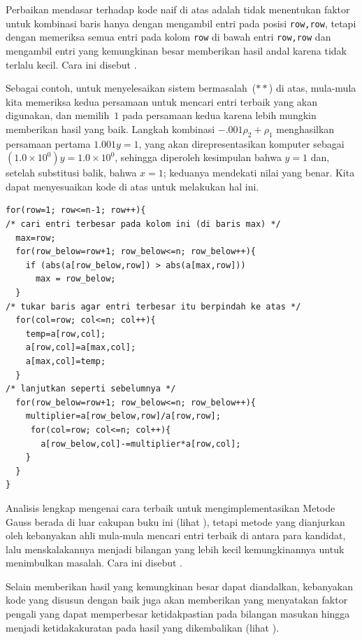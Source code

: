Perbaikan mendasar terhadap kode naif di atas adalah tidak menentukan faktor
untuk kombinasi baris hanya dengan mengambil entri pada posisi
\lstinline[style=inline]!row,row!, tetapi dengan memeriksa semua entri pada
kolom \lstinline[style=inline]!row! di bawah entri
\lstinline[style=inline]!row,row! dan mengambil entri yang kemungkinan besar
memberikan hasil andal karena tidak terlalu kecil.
Cara ini disebut .%

Sebagai contoh, untuk menyelesaikan sistem bermasalah~($**$) di atas, mula-mula
kita memeriksa kedua persamaan untuk mencari entri terbaik yang akan digunakan,
dan memilih~$1$ pada persamaan kedua karena lebih mungkin memberikan hasil yang
baik.
Langkah kombinasi $-.001\rho_2+\rho_1$ menghasilkan persamaan pertama
$1.001y=1$, yang akan direpresentasikan komputer sebagai
$(1.0\times 10^{0})y=1.0\times 10^{0}$, sehingga diperoleh kesimpulan bahwa
$y=1$ dan, setelah substitusi balik, bahwa $x=1$; keduanya mendekati nilai yang
benar.  
Kita dapat menyesuaikan kode di atas untuk melakukan hal ini.
\begin{lstlisting}
for(row=1; row<=n-1; row++){
/* cari entri terbesar pada kolom ini (di baris max) */
  max=row;
  for(row_below=row+1; row_below<=n; row_below++){
    if (abs(a[row_below,row]) > abs(a[max,row]))
      max = row_below;
  }
/* tukar baris agar entri terbesar itu berpindah ke atas */
  for(col=row; col<=n; col++){
    temp=a[row,col];
    a[row,col]=a[max,col];
    a[max,col]=temp;
  }
/* lanjutkan seperti sebelumnya */
  for(row_below=row+1; row_below<=n; row_below++){
    multiplier=a[row_below,row]/a[row,row];
     for(col=row; col<=n; col++){
       a[row_below,col]-=multiplier*a[row,col];
    }
  }
}
\end{lstlisting}

Analisis lengkap mengenai cara terbaik untuk mengimplementasikan Metode Gauss
berada di luar cakupan buku ini (lihat \cite{Wilkinson65}), tetapi metode yang
dianjurkan oleh kebanyakan ahli mula-mula mencari entri terbaik di antara para
kandidat, lalu menskalakannya menjadi bilangan yang lebih kecil kemungkinannya
untuk menimbulkan masalah.
Cara ini disebut
.

Selain memberikan hasil yang kemungkinan besar dapat diandalkan, kebanyakan
kode yang disusun dengan baik juga akan memberikan
%
yang menyatakan faktor pengali yang dapat memperbesar ketidakpastian pada
bilangan masukan hingga menjadi ketidakakuratan pada hasil yang dikembalikan
(lihat \cite{Rice}).

